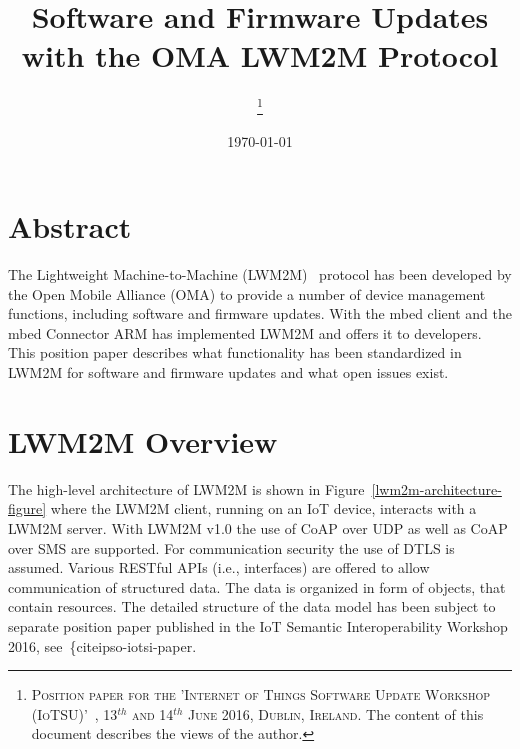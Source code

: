 \documentclass[peerreview, a4paper, 7pt]{IEEEtran}
\begin{document}
\title{Software and Firmware Updates with the OMA LWM2M Protocol}

\author{
\thanks{\textsc{Position paper for the 'Internet of Things Software Update Workshop (IoTSU)'~\cite{IOTSU}, 13$^{th}$ and 14$^{th}$ June 2016, Dublin, Ireland.} The content of this document describes the views of the author.}
}

\date{\today}

\maketitle


\section{Abstract}


The Lightweight Machine-to-Machine (LWM2M)~\cite{lwm2m} protocol has been developed by the Open Mobile Alliance (OMA) to provide a number of device management functions, including software and firmware updates. With the mbed client and the mbed Connector ARM has implemented LWM2M and offers it to developers. This position paper describes what functionality has been standardized in LWM2M for software and firmware updates and what open issues exist. 

\section{LWM2M Overview}
\label{lwm2m}

The high-level architecture of LWM2M is shown in Figure~\ref{lwm2m-architecture-figure} where the LWM2M client, running on an IoT device, interacts with a LWM2M server. With LWM2M v1.0 the use of CoAP over UDP as well as CoAP over SMS are supported. For communication security the use of DTLS is assumed. Various RESTful APIs (i.e., interfaces) are offered to allow communication of structured data. The data is organized in form of objects, that contain resources. The detailed structure of the data model has been subject to separate position paper published in the IoT Semantic Interoperability Workshop 2016, see~\{cite{ipso-iotsi-paper}. 
\end{document}
